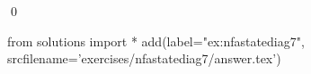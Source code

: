 
\begin{ex} 
  \label{ex:nfastatediag7}
  
  \qed
\end{ex} 
\begin{python0}
from solutions import *
add(label="ex:nfastatediag7",
    srcfilename='exercises/nfastatediag7/answer.tex') 
\end{python0}
